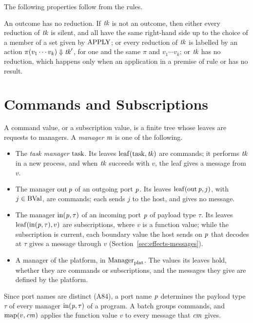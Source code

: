 The following properties follow from the rules.
\begin{property}
An outcome has no reduction. If $\mathit{tk}$ is not an outcome, then either every
reduction of $\mathit{tk}$ is silent, and all have the same right-hand side up to the
choice of a member of a set given by $\mathrm{APPLY}$; or every reduction of $\mathit{tk}$ is
labelled by an action $\pi(v_1\cdots v_k)\Downarrow \mathit{tk}'$, for one and the
same $\pi$ and $v_1\cdots v_k$; or $\mathit{tk}$ has no reduction, which happens only
when an application in a premise of rule 
or  has no result.
\end{property}

\section{Commands and Subscriptions}\label{sec:effects-commands}

A command value, or a subscription value, is a finite tree whose leaves are
requests to managers. A \emph{manager} $\mathit{m}$ is one of the following.
\begin{itemize}
\item The \emph{task manager} $\mathrm{task}$. Its leaves $\mathrm{leaf}(\mathrm{task},\mathit{tk})$
  are commands; it performs $\mathit{tk}$ in a new process, and when $\mathit{tk}$ succeeds
  with $v$, the leaf gives a message from $v$.
\item The manager $\mathrm{out}\,\mathit{p}$ of an outgoing port $\mathit{p}$. Its leaves
  $\mathrm{leaf}(\mathrm{out}\,\mathit{p},j)$, with $j\in\mathrm{BVal}$, are commands; each sends
  $j$ to the host, and gives no message.
\item The manager $\mathrm{in}(\mathit{p},\tau)$ of an incoming port $\mathit{p}$ of payload
  type $\tau$. Its leaves $\mathrm{leaf}(\mathrm{in}(\mathit{p},\tau),v)$ are subscriptions,
  where $v$ is a function value; while the subscription is current, each
  boundary value the host sends on $\mathit{p}$ that decodes at $\tau$ gives a message
  through $v$ (Section~\ref{sec:effects-messages}).
\item A manager of the platform, in $\mathrm{Manager}_{\mathrm{plat}}$. The values its leaves hold,
  whether they are commands or subscriptions, and the messages they give are
  defined by the platform. %
\end{itemize}
Since port names are distinct (A84), a port name $\mathit{p}$ determines the
payload type $\tau$ of every manager $\mathrm{in}(\mathit{p},\tau)$ of a program. A
batch groups commands, and $\mathrm{map}(v,\mathit{cm})$ applies the function value $v$ to
every message that $\mathit{cm}$ gives.

